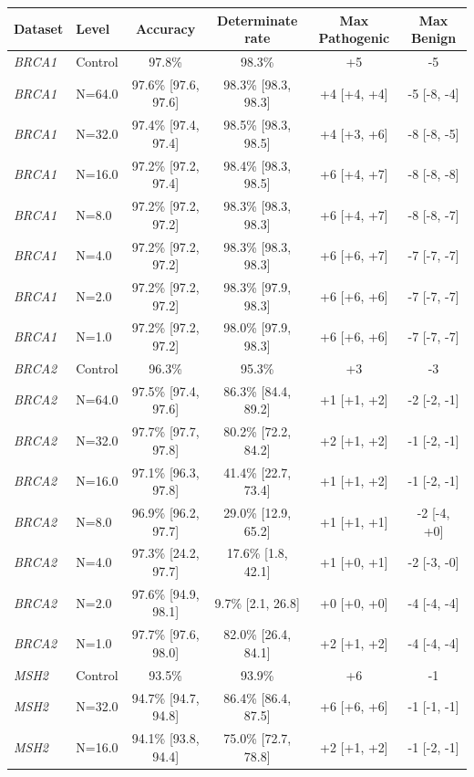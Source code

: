\begin{tabular}{llcccc}
\toprule
Dataset & Level & Accuracy & Determinate rate & Max Pathogenic & Max Benign \\
\midrule
\textit{BRCA1} & Control & 97.8\% & 98.3\% & +5 & -5 \\
\textit{BRCA1} & N=64.0 & 97.6\% [97.6, 97.6] & 98.3\% [98.3, 98.3] & +4 [+4, +4] & -5 [-8, -4] \\
\textit{BRCA1} & N=32.0 & 97.4\% [97.4, 97.4] & 98.5\% [98.3, 98.5] & +4 [+3, +6] & -8 [-8, -5] \\
\textit{BRCA1} & N=16.0 & 97.2\% [97.2, 97.4] & 98.4\% [98.3, 98.5] & +6 [+4, +7] & -8 [-8, -8] \\
\textit{BRCA1} & N=8.0 & 97.2\% [97.2, 97.2] & 98.3\% [98.3, 98.3] & +6 [+4, +7] & -8 [-8, -7] \\
\textit{BRCA1} & N=4.0 & 97.2\% [97.2, 97.2] & 98.3\% [98.3, 98.3] & +6 [+6, +7] & -7 [-7, -7] \\
\textit{BRCA1} & N=2.0 & 97.2\% [97.2, 97.2] & 98.3\% [97.9, 98.3] & +6 [+6, +6] & -7 [-7, -7] \\
\textit{BRCA1} & N=1.0 & 97.2\% [97.2, 97.2] & 98.0\% [97.9, 98.3] & +6 [+6, +6] & -7 [-7, -7] \\
\midrule
\textit{BRCA2} & Control & 96.3\% & 95.3\% & +3 & -3 \\
\textit{BRCA2} & N=64.0 & 97.5\% [97.4, 97.6] & 86.3\% [84.4, 89.2] & +1 [+1, +2] & -2 [-2, -1] \\
\textit{BRCA2} & N=32.0 & 97.7\% [97.7, 97.8] & 80.2\% [72.2, 84.2] & +2 [+1, +2] & -1 [-2, -1] \\
\textit{BRCA2} & N=16.0 & 97.1\% [96.3, 97.8] & 41.4\% [22.7, 73.4] & +1 [+1, +2] & -1 [-2, -1] \\
\textit{BRCA2} & N=8.0 & 96.9\% [96.2, 97.7] & 29.0\% [12.9, 65.2] & +1 [+1, +1] & -2 [-4, +0] \\
\textit{BRCA2} & N=4.0 & 97.3\% [24.2, 97.7] & 17.6\% [1.8, 42.1] & +1 [+0, +1] & -2 [-3, -0] \\
\textit{BRCA2} & N=2.0 & 97.6\% [94.9, 98.1] & 9.7\% [2.1, 26.8] & +0 [+0, +0] & -4 [-4, -4] \\
\textit{BRCA2} & N=1.0 & 97.7\% [97.6, 98.0] & 82.0\% [26.4, 84.1] & +2 [+1, +2] & -4 [-4, -4] \\
\midrule
\textit{MSH2} & Control & 93.5\% & 93.9\% & +6 & -1 \\
\textit{MSH2} & N=32.0 & 94.7\% [94.7, 94.8] & 86.4\% [86.4, 87.5] & +6 [+6, +6] & -1 [-1, -1] \\
\textit{MSH2} & N=16.0 & 94.1\% [93.8, 94.4] & 75.0\% [72.7, 78.8] & +2 [+1, +2] & -1 [-2, -1] \\

\end{tabular}

